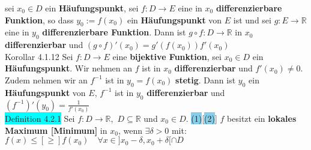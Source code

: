 \documentclass[landscape, 10pt]{article}
\newcommand{\R}{\mathbb{R}}
\begin{document}
\begin{multicols}{3}
                     sei \textcolor{NavyBlue}{$x_0\in D$}
                     ein \textbf{Häufungspunkt}, sei 
                     \textcolor{NavyBlue}{$f:D\longrightarrow E$}
                     eine in \textcolor{NavyBlue}{$x_0$}
                     \textbf{differenzierbare Funktion}, so dass 
                     \textcolor{NavyBlue}{$y_0:=f(x_0)$} ein 
                     \textbf{Häufungspunkt} von \textcolor{NavyBlue}{$E$} ist und 
                     sei \textcolor{NavyBlue}{$g:E\longrightarrow\R$} eine in 
                     \textcolor{NavyBlue}{$y_0$} 
                     \textbf{differenzierbare Funktion}. Dann ist 
                     \textcolor{NavyBlue}{$g\circ f:D\longrightarrow\R$} in 
                     \textcolor{NavyBlue}{$x_0$} \textbf{differenzierbar} und 
                     \textcolor{NavyBlue}{$(g\circ f)'(x_0)=g'(f(x_0))f'(x_0)$}\\
              \colorbox{BurntOrange}{Korollar 4.1.12}
                     Sei \textcolor{NavyBlue}{$f:D\longrightarrow E$} eine 
                     \textbf{bijektive Funktion}, sei 
                     \textcolor{NavyBlue}{$x_0\in D$} ein \textbf{Häufungspunkt}. 
                     Wir nehmen an \textcolor{NavyBlue}{$f$} ist 
                     in \textcolor{NavyBlue}{$x_0$} \textbf{differenzierbar} und 
                     \textcolor{NavyBlue}{$f'(x_0)\neq0$}. Zudem nehmen 
                     wir an \textcolor{NavyBlue}{$f^{-1}$} ist in \textcolor{NavyBlue}{$y_0=f(x_0)$}
                     \textbf{stetig}. Dann ist \textcolor{NavyBlue}{$y_0$} ein 
                     \textbf{Häufungspunkt} von \textcolor{NavyBlue}{$E$}, 
                     \textcolor{NavyBlue}{$f^{-1}$} ist in \textcolor{NavyBlue}{$y_0$} 
                     \textbf{differenzierbar} 
                     und \textcolor{NavyBlue}{$(f^{-1})'(y_0)=\frac{1}{f'(x_0)}$}\\
              \colorbox{cyan}{Definition 4.2.1} 
                     Sei \textcolor{NavyBlue}{$f:D\longrightarrow\R$},\,
                     \textcolor{NavyBlue}{$D\subseteq\R$}
                     und \textcolor{NavyBlue}{$x_0\in D$}. 
                     \colorbox{SkyBlue}{(1)}[\colorbox{SkyBlue}{(2)}] 
                     \textcolor{NavyBlue}{$f$} besitzt ein 
                     \textbf{lokales Maximum [Minimum]} in 
                     \textcolor{NavyBlue}{$x_0$}, wenn 
                     \textcolor{NavyBlue}{$\exists\delta>0$} mit: 
                     \textcolor{NavyBlue}{$f(x)\leqslant[\geqslant] f(x_0)\quad
                     \forall x\in]x_0-\delta,x_0+\delta[\cap D$} 

\end{multicols}
\end{document}
